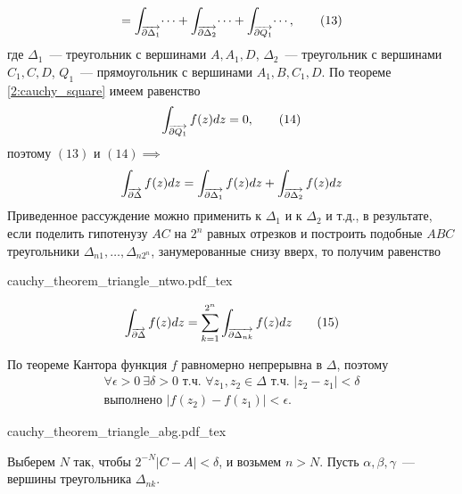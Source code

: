\documentclass[main]{subfiles}
\begin{document}
\begin{longProof}
\begin{multline*}
        = \AnClOrInt[\AnClOrCurve[\partial \Delta_1]] \dotsi + \AnClOrInt[\AnClOrCurve[\partial \Delta_2]] \dotsi + \AnClOrInt[\AnClOrCurve[\partial Q_1]] \dotsi, \tag{13}
    \end{multline*}
    где $\Delta_1$~--- треугольник с вершинами $A, A_1, D$, $\Delta_2$~--- треугольник с вершинами $C_1, C, D$, $Q_1$~--- прямоугольник с вершинами $A_1, B, C_1, D$.
    По теореме \ref{2:cauchy_square} имеем равенство
    \[\AnClOrInt[\AnClOrCurve[\partial Q_1]] f(z) dz = 0, \tag{14}\]
    поэтому $(13)$ и $(14) \implies$
    \[ \AnClOrInt[\AnClOrCurve[\partial \Delta]] f(z) dz = \AnClOrInt[\AnClOrCurve[\partial \Delta_1]] f(z) dz + \AnClOrInt[\AnClOrCurve[\partial \Delta_2]] f(z) dz\]
    Приведенное рассуждение можно применить к $\Delta_1$ и к $\Delta_2$ и т.д., в результате, если поделить гипотенузу $AC$ на $2^n$ равных отрезков и построить подобные $ABC$ треугольники $\Delta_{n1}, \dotsc, \Delta_{n2^n}$, занумерованные снизу вверх, то получим равенство

    \begin{minipage}{0.3\textwidth}
        \begin{center}
            {cauchy_theorem_triangle_ntwo.pdf_tex}
        \end{center}
    \end{minipage}
    \begin{minipage}{0.6\textwidth}
        \[\AnClOrInt[\AnClOrCurve[\partial \Delta]] f(z) dz = \sum_{k=1}^{2^n} \AnClOrInt[\AnClOrCurve[\partial \Delta_{nk}]] f(z) dz \tag{15}\]
    \end{minipage}

    По теореме Кантора функция $f$ равномерно непрерывна в $\Delta$, поэтому
    \begin{multline*}
        \forall \epsilon > 0\ \exists \delta > 0 \text{ т.ч. } \forall z_1, z_2 \in \Delta \text{ т.ч. } |z_2 - z_1| < \delta \\
        \text{выполнено } |f(z_2) - f(z_1)| < \epsilon.
    \end{multline*}
    \begin{minipage}{0.45\textwidth}
        \begin{center}
            \def\svgwidth{0.5\textwidth}
            {cauchy_theorem_triangle_abg.pdf_tex}
        \end{center}
    \end{minipage}
    \begin{minipage}{0.45\textwidth}
        Выберем $N$ так, чтобы $2^{-N} |C - A| < \delta$, и возьмем $n > N$.
        Пусть $\alpha, \beta, \gamma$~--- вершины треугольника $\Delta_{nk}$.
    \end{minipage}


\end{longProof}
\end{document}

